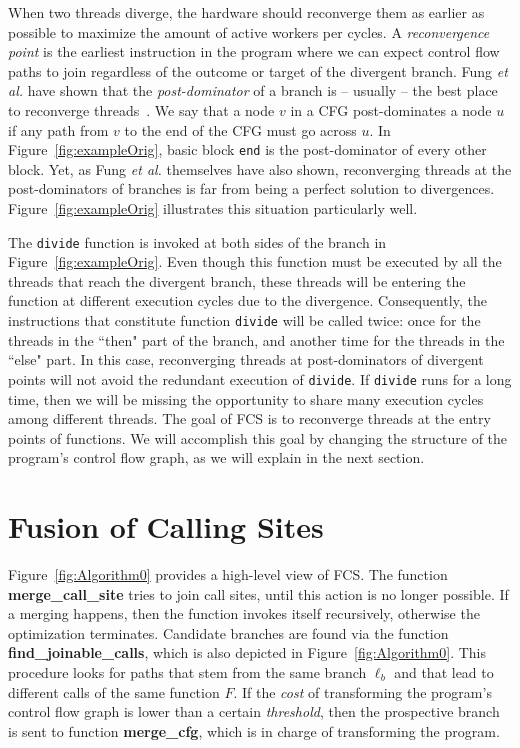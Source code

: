 \documentclass[times,10pt,twocolumn]{article}
\begin{document}
When two threads diverge, the hardware should reconverge them as earlier as
possible to maximize the amount of active workers per cycles.
A {\em reconvergence point} is the earliest instruction in the program where we
can expect control flow paths to join regardless of the outcome or target of
the divergent branch.
Fung {\em et al.} have shown that the {\em post-dominator} of a branch is --
usually -- the best place to reconverge threads~\cite{Fung07}.
We say that a node $v$ in a CFG post-dominates a node $u$ if any path from $v$
to the end of the CFG must go across $u$.
In Figure~\ref{fig:exampleOrig}, basic block \texttt{end} is the post-dominator
of every other block.
Yet, as Fung {\em et al.} themselves have also shown, reconverging threads at the
post-dominators of branches is far from being a perfect solution to divergences.
Figure~\ref{fig:exampleOrig} illustrates this situation particularly well.

The \texttt{divide} function is invoked at both sides of the branch in
Figure~\ref{fig:exampleOrig}.
Even though this function must be executed by all the threads that reach the
divergent branch, these threads will be entering the function at different
execution cycles due to the divergence.
Consequently, the instructions that constitute function \texttt{divide} will
be called twice: once for the threads in the ``then" part of the branch, and
another time for the threads in the ``else" part.
In this case, reconverging threads at post-dominators of divergent points will
not avoid the redundant execution of \texttt{divide}.
If \texttt{divide} runs for a long time, then we will be missing the
opportunity to share many execution cycles among different threads.
The goal of FCS is to reconverge threads at the entry points
of functions.
We will accomplish this goal by changing the structure of the program's
control flow graph, as we will explain in the next section.

\section{Fusion of Calling Sites}
\label{sec:sol}

Figure~\ref{fig:Algorithm0} provides a high-level view of FCS.
The function \textbf{merge\_call\_site} tries to join call sites, until this
action is no longer possible.
If a merging happens, then the function invokes itself recursively, otherwise
the optimization terminates.
Candidate branches are found via the function \textbf{find\_joinable\_calls},
which is also depicted in Figure~\ref{fig:Algorithm0}.
This procedure looks for paths that stem from the same branch $\ell_b$ and that
lead to different calls of the same function $F$.
If the {\em cost} of transforming the program's control flow graph is lower than
a certain {\em threshold}, then the prospective branch is sent to function
\textbf{merge\_cfg}, which is in charge of transforming the program.
\end{document}
